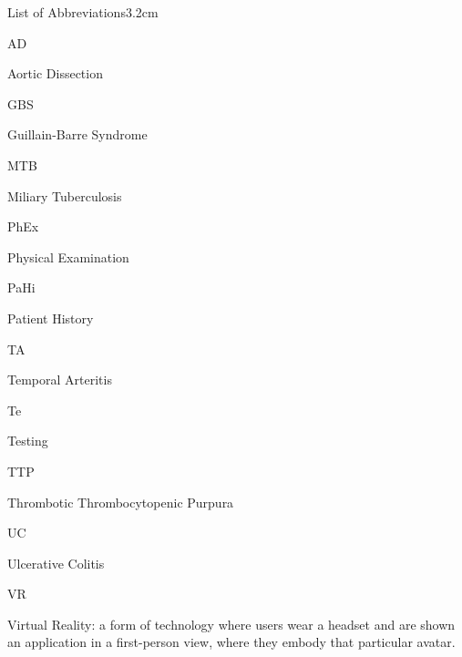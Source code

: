 \documentclass[a4paper, nobind]{templates/ociamthesis}
\begin{document}
\begin{romanpages}
\listoftables
  \mtcaddchapter
\begin{mclistof}{List of Abbreviations}{3.2cm}

\item[AD]

Aortic Dissection

\item[GBS]

Guillain-Barre Syndrome

\item[MTB]

Miliary Tuberculosis

\item[PhEx]

Physical Examination

\item[PaHi]

Patient History

\item[TA]

Temporal Arteritis

\item[Te]

Testing

\item[TTP]

Thrombotic Thrombocytopenic Purpura

\item[UC]

Ulcerative Colitis

\item[VR]

Virtual Reality: a form of technology where users wear a headset and are shown an application in a first-person view, where they embody that particular avatar.

\end{mclistof} 


\end{romanpages}

\flushbottom
\end{document}
